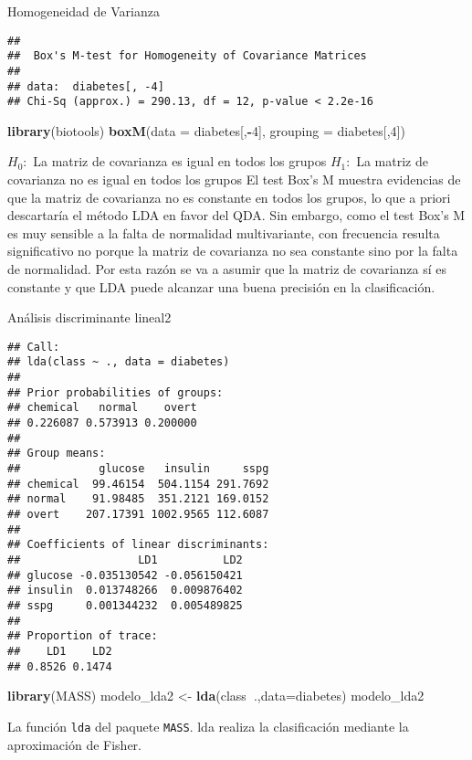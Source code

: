 \documentclass[ignorenonframetext,]{beamer}
\newenvironment{Shaded}{\begin{snugshade}}{\end{snugshade}}
\newcommand{\KeywordTok}[1]{\textcolor[rgb]{0.13,0.29,0.53}{\textbf{#1}}}
\newcommand{\DataTypeTok}[1]{\textcolor[rgb]{0.13,0.29,0.53}{#1}}
\newcommand{\DecValTok}[1]{\textcolor[rgb]{0.00,0.00,0.81}{#1}}
\newcommand{\StringTok}[1]{\textcolor[rgb]{0.31,0.60,0.02}{#1}}
\newcommand{\OperatorTok}[1]{\textcolor[rgb]{0.81,0.36,0.00}{\textbf{#1}}}
\newcommand{\NormalTok}[1]{#1}
\begin{document}
\begin{frame}[fragile]{Homogeneidad de Varianza}

\hypertarget{left}{}
\begin{verbatim}
## 
##  Box's M-test for Homogeneity of Covariance Matrices
## 
## data:  diabetes[, -4]
## Chi-Sq (approx.) = 290.13, df = 12, p-value < 2.2e-16
\end{verbatim}

\hypertarget{right}{}
\begin{Shaded}
\begin{Highlighting}[]
\KeywordTok{library}\NormalTok{(biotools)}
\KeywordTok{boxM}\NormalTok{(}\DataTypeTok{data =}\NormalTok{ diabetes[,}\OperatorTok{-}\DecValTok{4}\NormalTok{], }\DataTypeTok{grouping =}\NormalTok{ diabetes[,}\DecValTok{4}\NormalTok{])}
\end{Highlighting}
\end{Shaded}

\(H_0:\) La matriz de covarianza es igual en todos los grupos \(H_1:\)
La matriz de covarianza no es igual en todos los grupos El test Box's M
muestra evidencias de que la matriz de covarianza no es constante en
todos los grupos, lo que a priori descartaría el método LDA en favor del
QDA. Sin embargo, como el test Box's M es muy sensible a la falta de
normalidad multivariante, con frecuencia resulta significativo no porque
la matriz de covarianza no sea constante sino por la falta de
normalidad. Por esta razón se va a asumir que la matriz de covarianza sí
es constante y que LDA puede alcanzar una buena precisión en la
clasificación.

\end{frame}

\begin{frame}[fragile]{Análisis discriminante lineal2}

\hypertarget{left}{}
\begin{verbatim}
## Call:
## lda(class ~ ., data = diabetes)
## 
## Prior probabilities of groups:
## chemical   normal    overt 
## 0.226087 0.573913 0.200000 
## 
## Group means:
##            glucose   insulin     sspg
## chemical  99.46154  504.1154 291.7692
## normal    91.98485  351.2121 169.0152
## overt    207.17391 1002.9565 112.6087
## 
## Coefficients of linear discriminants:
##                  LD1          LD2
## glucose -0.035130542 -0.056150421
## insulin  0.013748266  0.009876402
## sspg     0.001344232  0.005489825
## 
## Proportion of trace:
##    LD1    LD2 
## 0.8526 0.1474
\end{verbatim}

\hypertarget{right}{}
\begin{Shaded}
\begin{Highlighting}[]
\KeywordTok{library}\NormalTok{(MASS)}
\NormalTok{modelo_lda2 <-}\StringTok{ }\KeywordTok{lda}\NormalTok{(class}\OperatorTok{~}\NormalTok{.,}\DataTypeTok{data=}\NormalTok{diabetes)}
\NormalTok{modelo_lda2}
\end{Highlighting}
\end{Shaded}

La función \texttt{lda} del paquete \texttt{MASS}. lda realiza la
clasificación mediante la aproximación de Fisher.

\end{frame}
\end{document}
